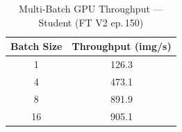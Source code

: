 \begin{table}[!t]
\caption{Multi-Batch GPU Throughput --- Student (FT V2 ep.\,150)}
\label{tab:throughput}
\centering
\footnotesize
\setlength{\tabcolsep}{8pt}
\renewcommand{\arraystretch}{1.1}
\begin{tabular}{cc}
\toprule
\textbf{Batch Size} & \textbf{Throughput (img/s)} \\
\midrule
1  & 126.3 \\
4  & 473.1 \\
8  & 891.9 \\
16 & 905.1 \\
\bottomrule
\end{tabular}
\end{table}
